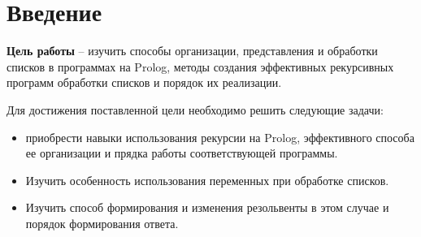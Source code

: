 {\large\section*{Введение}}

\textbf{Цель работы} -- изучить способы организации, представления и обработки списков в программах на Prolog, методы создания эффективных рекурсивных программ обработки списков и порядок их реализации.

Для достижения поставленной цели необходимо решить следующие задачи:

\begin{itemize}[$\bullet$]
	\item приобрести навыки использования рекурсии на Prolog, эффективного способа ее организации и прядка работы соответствующей программы.
	\item Изучить особенность использования переменных при обработке списков.
	\item Изучить способ формирования и изменения резольвенты в этом случае и порядок формирования ответа.
\end{itemize}
